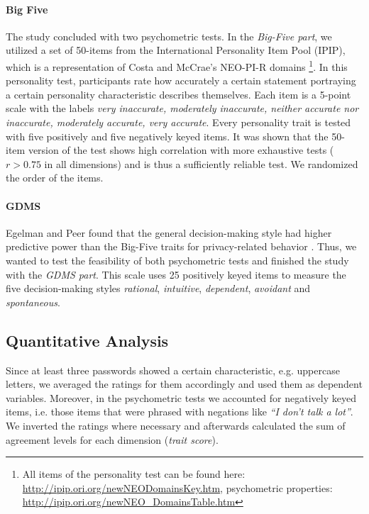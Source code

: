 \paragraph{Big Five} The study concluded with two psychometric tests. In the \textit{Big-Five part}, we utilized a set of 50-items from the International Personality Item Pool (IPIP), which is a representation of Costa and McCrae's NEO-PI-R domains \citep{Costa1992NEO}\footnote{All items of the personality test can be found here: \url{http://ipip.ori.org/newNEODomainsKey.htm}, psychometric properties: \url{http://ipip.ori.org/newNEO_DomainsTable.htm}}. In this personality test, participants rate how accurately a certain statement portraying a certain personality characteristic describes themselves. Each item is a 5-point scale with the labels \textit{very inaccurate, moderately inaccurate, neither accurate nor inaccurate, moderately accurate, very accurate}. Every personality trait is tested with five positively and five negatively keyed items. It was shown that the 50-item version of the test shows high correlation with more exhaustive tests ($r > 0.75$ in all dimensions) and is thus a sufficiently reliable test. We randomized the order of the items.

\paragraph{GDMS} Egelman and Peer found that the general decision-making style had higher predictive power than the Big-Five traits for privacy-related behavior \cite{Egelman2015AverageUser}. Thus, we wanted to test the feasibility of both psychometric tests and finished the study with the \textit{GDMS part}. This scale uses 25 positively keyed items to measure the five decision-making styles \textit{rational}, \textit{intuitive}, \textit{dependent}, \textit{avoidant} and \textit{spontaneous}. 



\subsection{Quantitative Analysis}
Since at least three passwords showed a certain characteristic, e.g. uppercase letters, we averaged the ratings for them accordingly and used them as dependent variables. Moreover, in the psychometric tests we accounted for negatively keyed items, i.e. those items that were phrased with negations like \textit{``I don't talk a lot''}. We inverted the ratings where necessary and afterwards calculated the sum of agreement levels for each dimension (\textit{trait score}). 

